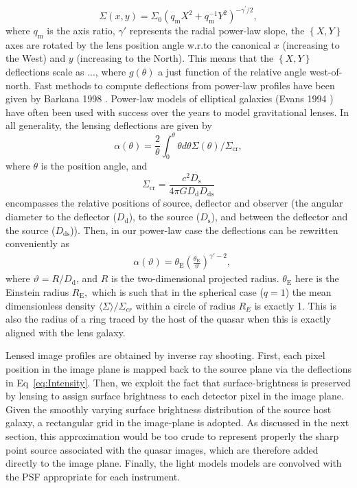 \documentclass[a4paper,11pt]{article}
\begin{document}
\begin{equation}
\Sigma(x,y)=\Sigma_{0}(q_\mathrm{m} X^{2}+q_\mathrm{m}^{-1}Y^{2})^{-\gamma^{\prime}/2},
\end{equation}
%
where $q_\mathrm{m}$ is the axis ratio, $\gamma'$ represents the radial power-law
slope, the $\left\{X,Y\right\}$ axes are rotated by the lens position
angle w.r.to the canonical $x$ (increasing to the West) and $y$
(increasing to the North). This means that the $\left\{X,Y\right\}$
deflections scale as ..., where $g(\theta)$ a just function of the
relative angle west-of-north. Fast methods to compute deflections from
power-law profiles have been given by Barkana 1998
\cite{1998ApJ...502..531B}. Power-law models of elliptical galaxies
(Evans 1994 \cite{1994MNRAS.267..333E}) have often been used with
success over the years to model gravitational lenses. In all
generality, the lensing deflections are given by
%
\begin{equation}
\alpha(\theta) = \frac{2}{\theta} \int_{0}^{\theta} \theta d\theta \Sigma (\theta) /\Sigma_{\mathrm{cr}} ,
\end{equation}
%
where $\theta$ is the position angle, and 
%
\begin{equation}
\Sigma_{\mathrm{cr}} = \frac{c^{2}D_{\mathrm{s}}}{4\pi G D_{\mathrm{d}} D_{\mathrm{ds}}}
\end{equation}
%
encompasses the relative positions of source, deflector and observer
(the angular diameter to the deflector ($D_{\mathrm{d}}$), to the
source ($D_{\mathrm{s}}$), and between the deflector and the source
($D_{\mathrm{ds}}$)). Then, in our power-law case the deflections can
be rewritten conveniently as
%
\begin{eqnarray}
   \label{eq:Intensity}
   &\alpha(\vartheta) = \theta_{\mathrm{E}}\left(\frac{\theta_{\mathrm{E}}}{\vartheta}\right)^{\gamma'-2} , 
\end{eqnarray}
%
where $\vartheta = R/D_{\mathrm{d}}$, and $R$ is the two-dimensional
projected radius. $\theta_{\mathrm{E}}$ here is the Einstein radius
$R_{\mathrm{E}},$ which is such that in the spherical case ($q=1$) the
mean dimensionless density $\langle\Sigma\rangle/\Sigma_{cr}$ within a
circle of radius $R_E$ is exactly 1. This is also the radius of a ring
traced by the host of the quasar when this is exactly aligned with the
lens galaxy.

Lensed image profiles are obtained by inverse ray shooting. First,
each pixel position in the image plane is mapped back to the source
plane via the deflections in Eq~\ref{eq:Intensity}. Then, we exploit
the fact that surface-brightness is preserved by lensing to assign
surface brightness to each detector pixel in the image plane. Given
the smoothly varying surface brightness distribution of the source
host galaxy, a rectangular grid in the image-plane is adopted. As
discussed in the next section, this approximation would be too crude
to represent properly the sharp point source associated with the
quasar images, which are therefore added directly to the image plane.
Finally, the light models models are convolved with the PSF
appropriate for each instrument.
\end{document}
